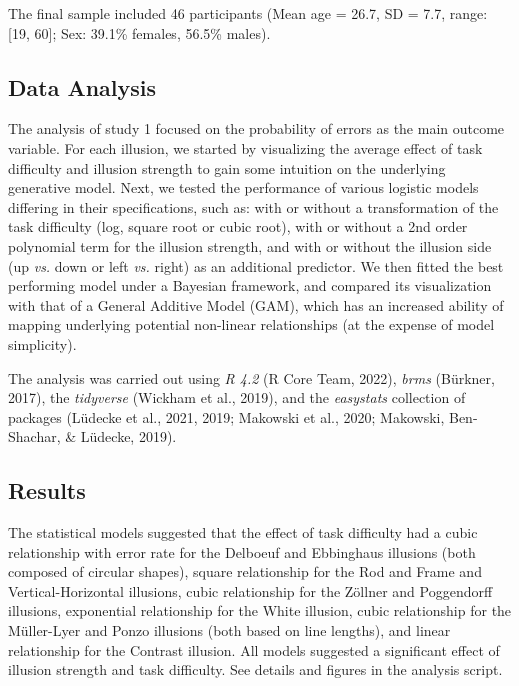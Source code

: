 \documentclass[
  man,floatsintext]{apa6}
\begin{document}
The final sample included 46 participants (Mean age = 26.7, SD = 7.7, range: {[}19, 60{]}; Sex: 39.1\% females, 56.5\% males).

\hypertarget{data-analysis}{%
\subsection{Data Analysis}\label{data-analysis}}

The analysis of study 1 focused on the probability of errors as the main outcome variable. For each illusion, we started by visualizing the average effect of task difficulty and illusion strength to gain some intuition on the underlying generative model. Next, we tested the performance of various logistic models differing in their specifications, such as: with or without a transformation of the task difficulty (log, square root or cubic root), with or without a 2nd order polynomial term for the illusion strength, and with or without the illusion side (up \emph{vs.} down or left \emph{vs.} right) as an additional predictor. We then fitted the best performing model under a Bayesian framework, and compared its visualization with that of a General Additive Model (GAM), which has an increased ability of mapping underlying potential non-linear relationships (at the expense of model simplicity).

The analysis was carried out using \emph{R 4.2} (R Core Team, 2022), \emph{brms} (Bürkner, 2017), the \emph{tidyverse} (Wickham et al., 2019), and the \emph{easystats} collection of packages (Lüdecke et al., 2021, 2019; Makowski et al., 2020; Makowski, Ben-Shachar, \& Lüdecke, 2019).

\hypertarget{results}{%
\subsection{Results}\label{results}}

The statistical models suggested that the effect of task difficulty had a cubic relationship with error rate for the Delboeuf and Ebbinghaus illusions (both composed of circular shapes), square relationship for the Rod and Frame and Vertical-Horizontal illusions, cubic relationship for the Zöllner and Poggendorff illusions, exponential relationship for the White illusion, cubic relationship for the Müller-Lyer and Ponzo illusions (both based on line lengths), and linear relationship for the Contrast illusion. All models suggested a significant effect of illusion strength and task difficulty. See details and figures in the analysis script.
\end{document}

